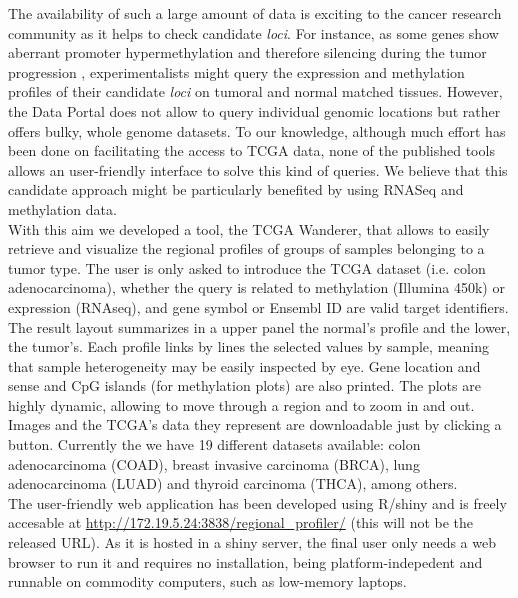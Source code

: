 \documentclass{article}
\begin{document}
The availability of such a large amount of data is exciting to the cancer research community as it helps to check candidate \textit{loci}. For instance, as some genes show aberrant promoter hypermethylation and therefore silencing during the tumor progression \cite{jones2002fundamental}, experimentalists might query the expression and methylation profiles of their candidate \textit{loci} on tumoral and normal matched tissues. However, the Data Portal does not allow to query individual genomic locations but rather offers bulky, whole genome datasets. To our knowledge, although much effort has been done on facilitating the access to TCGA data, none of the published tools allows an user-friendly interface to solve this kind of queries. We believe that this candidate approach might be particularly benefited by using RNASeq and methylation data.\\


With this aim we developed a tool, the TCGA Wanderer, that allows to easily retrieve and visualize the regional profiles of groups of samples belonging to a tumor type. The user is only asked to introduce the TCGA dataset (i.e. colon adenocarcinoma), whether the query is related to methylation (Illumina 450k) or expression (RNAseq), and gene symbol or Ensembl ID are valid target identifiers. The result layout summarizes in a upper panel the normal's profile and the lower, the tumor's. Each profile links by lines the selected values by sample, meaning that sample heterogeneity may be easily inspected by eye. Gene location and sense and CpG islands (for methylation plots) are also printed. The plots are highly dynamic, allowing to move through a region and to zoom in and out. Images and the TCGA's data they represent are downloadable just by clicking a button. Currently the we have 19 different datasets available: colon adenocarcinoma (COAD), breast invasive carcinoma (BRCA), lung adenocarcinoma (LUAD) and thyroid carcinoma (THCA), among others.  \\


The user-friendly web application has been developed using R/shiny and is freely accesable at \url{http://172.19.5.24:3838/regional_profiler/} (this will not be the released URL). As it is hosted in a shiny server, the final user only needs a web browser to run it and requires no installation, being platform-indepedent and runnable on commodity computers, such as low-memory laptops.\\
\end{document}
